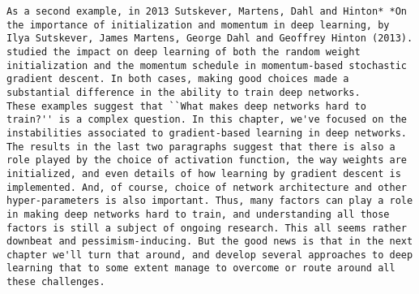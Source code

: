 \begin{lstlisting}
As a second example, in 2013 Sutskever, Martens, Dahl and Hinton* *On the importance of initialization and momentum in deep learning, by Ilya Sutskever, James Martens, George Dahl and Geoffrey Hinton (2013). studied the impact on deep learning of both the random weight initialization and the momentum schedule in momentum-based stochastic gradient descent. In both cases, making good choices made a substantial difference in the ability to train deep networks.
These examples suggest that ``What makes deep networks hard to train?'' is a complex question. In this chapter, we've focused on the instabilities associated to gradient-based learning in deep networks. The results in the last two paragraphs suggest that there is also a role played by the choice of activation function, the way weights are initialized, and even details of how learning by gradient descent is implemented. And, of course, choice of network architecture and other hyper-parameters is also important. Thus, many factors can play a role in making deep networks hard to train, and understanding all those factors is still a subject of ongoing research. This all seems rather downbeat and pessimism-inducing. But the good news is that in the next chapter we'll turn that around, and develop several approaches to deep learning that to some extent manage to overcome or route around all these challenges.


\end{lstlisting}
